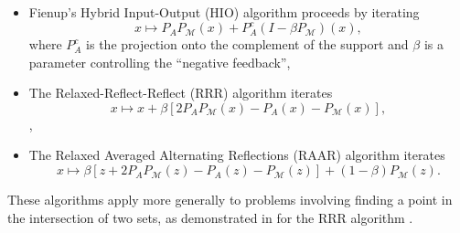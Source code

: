 \documentclass[journal]{IEEEtran}
\theoremstyle{definition}
\theoremstyle{remark}
\theoremstyle{definition}
\theoremstyle{problem}
\theoremstyle{definition}
\newcommand{\MM}{\mathcal{M}}
\newcommand{\TODO}[1]{{\color{red}{[#1]}}}
\begin{document}
\begin{itemize}
    \item Fienup's Hybrid Input-Output (HIO) algorithm proceeds by iterating 
    \begin{equation}\label{eq:HIO}
        x\mapsto P_AP_{\MM}(x) + P_A^c(I-\beta P_{\MM})(x),
    \end{equation} 
    where $P_A^c$ is the projection onto the complement of the support and $\beta$ is a parameter controlling the ``negative feedback'',
    \item The Relaxed-Reflect-Reflect (RRR) algorithm iterates
    \begin{equation}\label{eq:RRR}
        x\mapsto x + \beta\left[2P_AP_{\MM}(x)-P_A(x)-P_{\MM}(x)\right],
    \end{equation},
    \item The Relaxed Averaged Alternating Reflections (RAAR) algorithm iterates
    \begin{equation}\label{eq:RAAR}
        x\mapsto \beta\left[z + 2P_AP_{\MM}(z)-P_A(z)-P_{\MM}(z)\right] + (1-\beta)P_{\MM}(z).
    \end{equation}
\end{itemize}
These algorithms apply more generally to problems involving finding a point in the intersection of two sets, as demonstrated in \TODO{Veit, PNAS} for the RRR algorithm \TODO{Actually, "difference map"}.
\end{document}
